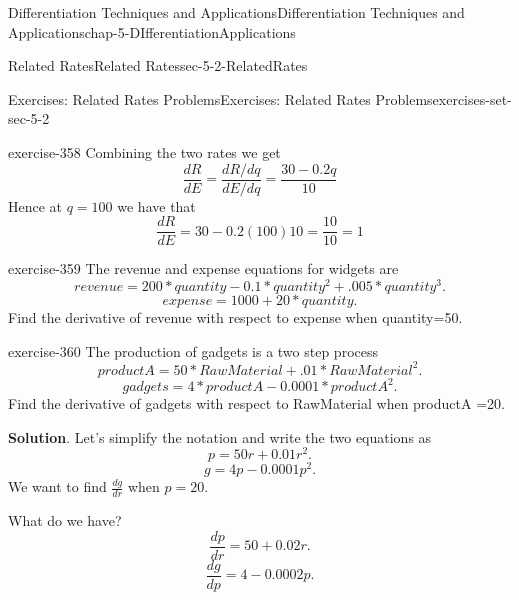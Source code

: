 \documentclass[oneside,10pt,]{book}
\numberwithin{equation}{section}
\begin{document}
\begin{chapterptx}{Differentiation Techniques and Applications}{}{Differentiation Techniques and Applications}{}{}{chap-5-DIfferentiationApplications}
\begin{sectionptx}{Related Rates}{}{Related Rates}{}{}{sec-5-2-RelatedRates}
\begin{exercises-subsection-numberless}{Exercises: Related Rates Problems}{}{Exercises: Related Rates Problems}{}{}{exercises-set-sec-5-2}
\begin{divisionexercise}{13}{}{}{exercise-358}
Combining the two rates we get%
%
\begin{equation*}
\frac{dR}{dE}=\frac{dR/dq}{dE/dq}=\frac{30-0.2q}{10}
\end{equation*}
\hypertarget{p-1998}{}%
Hence at \(q =100\) we have that%
%
\begin{equation*}
\frac{dR}{dE}={30-0.2(100)}{10}=\frac{10}{10}=1
\end{equation*}
\end{divisionexercise}%
\begin{divisionexercise}{14}{}{}{exercise-359}%
\hypertarget{p-1999}{}%
The revenue and expense equations for widgets are%
%
\begin{equation*}
revenue=200*quantity-0.1*quantity^2+.005*quantity^3.
\end{equation*}
%
\begin{equation*}
expense=1000+20*quantity.
\end{equation*}
\hypertarget{p-2000}{}%
Find the derivative of revenue with respect to expense when quantity=50.%
\end{divisionexercise}%
\begin{divisionexercise}{15}{}{}{exercise-360}%
\hypertarget{p-2001}{}%
The production of gadgets is a two step process%
%
\begin{equation*}
productA=50*RawMaterial+.01*RawMaterial^2.
\end{equation*}
%
\begin{equation*}
gadgets=4*productA-0.0001*productA^2.
\end{equation*}
\hypertarget{p-2002}{}%
Find the derivative of gadgets with respect to RawMaterial when productA =20.%
\par\smallskip%
\noindent\textbf{Solution}.\hypertarget{solution-181}{}\quad%
\hypertarget{p-2003}{}%
Let’s simplify the notation and write the two equations as%
%
\begin{equation*}
p=50r+0.01 r^2.
\end{equation*}
%
\begin{equation*}
g=4 p-0.0001 p^2.
\end{equation*}
\hypertarget{p-2004}{}%
We want to find \(\frac{dg}{dr}\) when \(p = 20\).%
\par
\hypertarget{p-2005}{}%
What do we have?%
%
\begin{equation*}
\frac{dp}{dr}=50+0.02 r.
\end{equation*}
%
\begin{equation*}
\frac{dg}{dp}=4 -0.0002 p.
\end{equation*}

\end{divisionexercise}
\end{exercises-subsection-numberless}
\end{sectionptx}
\end{chapterptx}
\end{document}
